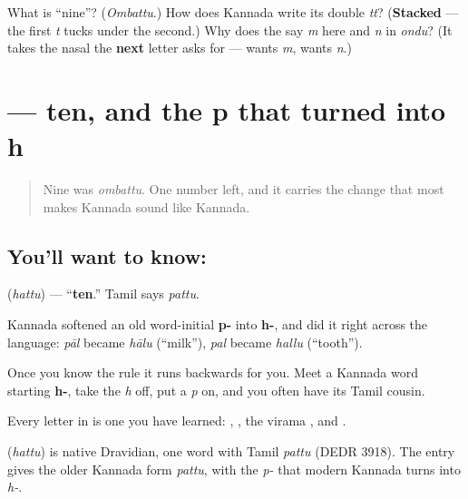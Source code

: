 \begin{tcolorbox}[breakable,colback=teal!4,colframe=teal!35!black,title={Before you move on}]
What is \textquotedblleft{}nine\textquotedblright{}? (\emph{Ombattu}.) How does Kannada write its double \emph{tt}? (\textbf{Stacked} — the first \emph{t} tucks under the second.) Why does the  say \emph{m} here and \emph{n} in \emph{ondu}? (It takes the nasal the \textbf{next} letter asks for —  wants \emph{m},  wants \emph{n}.)
\end{tcolorbox}
\section[\texorpdfstring{\kn{ಹತ್ತು} (hattu)}{ಹತ್ತು (hattu)}]{ — ten, and the p that turned into h}

\label{lesson:KA-C07-hattu}



\begin{quote}
Nine was \emph{ombattu}. One number left, and it carries the change that most makes Kannada sound like Kannada.
\end{quote}

\subsection*{You'll want to know: }
\textbf{} (\emph{hattu}) — \textquotedblleft{}\textbf{ten}.\textquotedblright{} Tamil says \emph{pattu}.

Kannada softened an old word-initial \textbf{p-} into \textbf{h-}, and did it right across the language: \emph{pāl} became \emph{hālu} (\textquotedblleft{}milk\textquotedblright{}), \emph{pal} became \emph{hallu} (\textquotedblleft{}tooth\textquotedblright{}).

Once you know the rule it runs backwards for you. Meet a Kannada word starting \textbf{h-}, take the \emph{h} off, put a \emph{p} on, and you often have its Tamil cousin.

Every letter in  is one you have learned: \textbf{}, \textbf{}, the virama \textbf{}, and \textbf{}.

\begin{cousinweb}
\textbf{} (\emph{hattu}) is native Dravidian, one word with Tamil \emph{pattu} (DEDR 3918). The entry gives the older Kannada form \emph{pattu}, with the \emph{p-} that modern Kannada turns into \emph{h-}.
\end{cousinweb}

